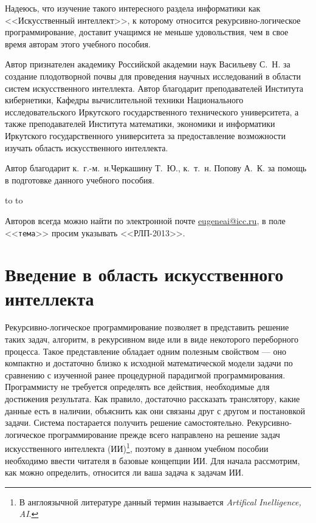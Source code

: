 \documentclass[12pt, openany, twoside]{book} %
\begin{document}
Надеюсь, что изучение такого интересного раздела информатики как <<Искусственный интеллект>>, к которому относится рекурсивно-логическое программирование, доставит учащимся не меньше удовольствия, чем в свое время авторам этого учебного пособия.

Автор признателен академику Российской академии наук Васильеву С.~Н. за создание плодотворной почвы для проведения научных исследований в области систем искусственного интеллекта. Автор благодарит преподавателей Института кибернетики, Кафедры вычислительной техники Национального исследовательского Иркутского государственного технического университета, а также преподавателей Института математики, экономики и информатики Иркутского государственного университета за предоставление возможности изучать область искусственного интеллекта.

Автор благодарит к.~г.-м.~н.Черкашину  Т.~Ю., к.~т.~н. Попову А.~К. за помощь в подготовке данного учебного пособия.

\medskip
\noindent\hbox to \linewidth{\hfill\sf С.~н.~с. ИДСТУ СО РАН, доцент кафедр ВТ ИрГТУ и ИТ ИМЭИ ИГУ}
\noindent\hbox to \linewidth{\hfill\sf к.~т.~н. Е.~А.~Черкашин}

\vfill
\makeatletter
{} Авторов всегда можно найти по электронной почте \href{mailto:eugeneai@icc.ru}{eugeneai@icc.ru}, в поле <<{\tt тема}>> просим указывать <<РЛП-2013>>.
\makeatother

\chapter{Введение в область искусственного интеллекта}

Рекурсивно-логическое программирование позволяет в представить решение таких задач, алгоритм, в рекурсивном виде или в виде некоторого переборного процесса. Такое представление обладает одним полезным свойством --- оно компактно и достаточно близко к исходной математической модели задачи по сравнению с изученной ранее процедурной парадигмой программирования. Программисту не требуется определять все действия, необходимые для достижения результата. Как правило, достаточно рассказать транслятору, какие данные есть в наличии, объяснить как они связаны друг с другом и постановкой задачи. Система постарается получить решение самостоятельно. Рекурсивно-логическое программирование прежде всего направлено на решение задач искусственного интеллекта (ИИ)\footnote{В англоязычной литературе данный термин называется \emph{Artifical Inelligence, AI}. }, поэтому в данном учебном пособии необходимо ввести читателя в базовые концепции ИИ. Для начала рассмотрим, как можно определить, относится ли ваша задача к задачам ИИ.
\end{document}
